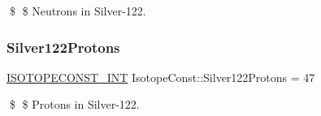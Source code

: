 \$ \$ Neutrons in Silver-\/122. \mbox{\label{group___isotope_const-_silver-_ag122_gac91db142afce99dbd621c78771fea59b}} 
\subsubsection{\texorpdfstring{Silver122\+Protons}{Silver122Protons}}
{\footnotesize\ttfamily \mbox{\hyperlink{group___isotope_const-_macros_ga5f18360b3e99483a35c32d789e62621c}{I\+S\+O\+T\+O\+P\+E\+C\+O\+N\+S\+T\+\_\+\+I\+NT}} Isotope\+Const\+::\+Silver122\+Protons = 47}

\$ \$ Protons in Silver-\/122. 